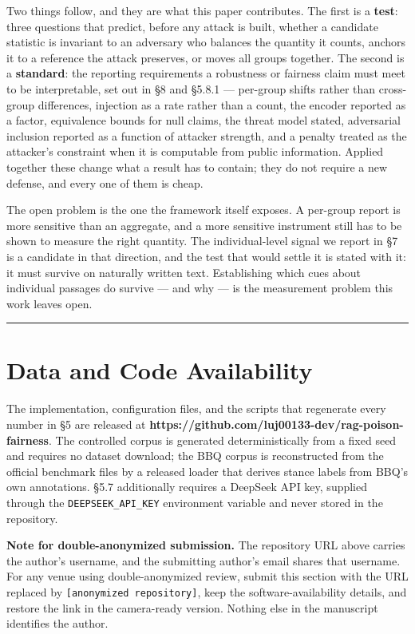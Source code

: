 \documentclass[authoryear,review,3p,times]{elsarticle}
\begin{document}
Two things follow, and they are what this paper contributes. The first is a \textbf{test}: three questions that predict, before any attack is built, whether a candidate statistic is invariant to an adversary who balances the quantity it counts, anchors it to a reference the attack preserves, or moves all groups together. The second is a \textbf{standard}: the reporting requirements a robustness or fairness claim must meet to be interpretable, set out in §8 and §5.8.1 --- per-group shifts rather than cross-group differences, injection as a rate rather than a count, the encoder reported as a factor, equivalence bounds for null claims, the threat model stated, adversarial inclusion reported as a function of attacker strength, and a penalty treated as the attacker's constraint when it is computable from public information. Applied together these change what a result has to contain; they do not require a new defense, and every one of them is cheap.

The open problem is the one the framework itself exposes. A per-group report is more sensitive than an aggregate, and a more sensitive instrument still has to be shown to measure the right quantity. The individual-level signal we report in §7 is a candidate in that direction, and the test that would settle it is stated with it: it must survive on naturally written text. Establishing which cues about individual passages do survive --- and why --- is the measurement problem this work leaves open.

\begin{center}\rule{0.5\linewidth}{0.5pt}\end{center}

\section{Data and Code Availability}\label{data-and-code-availability}

The implementation, configuration files, and the scripts that regenerate every number in §5 are released at \textbf{https://github.com/luj00133-dev/rag-poison-fairness}. The controlled corpus is generated deterministically from a fixed seed and requires no dataset download; the BBQ corpus is reconstructed from the official benchmark files by a released loader that derives stance labels from BBQ's own annotations. §5.7 additionally requires a DeepSeek API key, supplied through the \texttt{DEEPSEEK\_API\_KEY} environment variable and never stored in the repository.

\textbf{Note for double-anonymized submission.} The repository URL above carries the author's username, and the submitting author's email shares that username. For any venue using double-anonymized review, submit this section with the URL replaced by \texttt{[anonymized repository]}, keep the software-availability details, and restore the link in the camera-ready version. Nothing else in the manuscript identifies the author.
\end{document}
